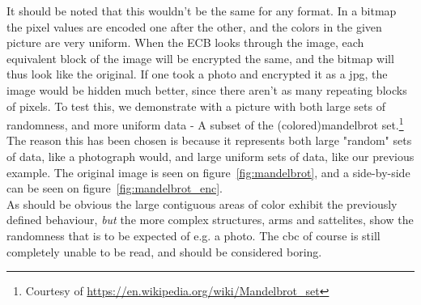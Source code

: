 \documentclass{article}
\begin{document}
It should be noted that this wouldn't be the same for any format. In a bitmap the
pixel values are encoded one after the other, and the colors in the given picture
are very uniform. When the ECB looks through the image, each equivalent block of the
image will be encrypted the same, and the bitmap will thus look like the original. If
one took a photo and encrypted it as a jpg, the image would be hidden much better,
since there aren't as many repeating blocks of pixels. To test this, we demonstrate
with a picture with both large sets of randomness, and more uniform data - A subset
of the (colored)mandelbrot set.\footnote{Courtesy of
\url{https://en.wikipedia.org/wiki/Mandelbrot_set}} The reason this has been chosen
is because it represents both large "random" sets of data, like a photograph would,
and large uniform sets of data, like our previous example. The original image is
seen on figure~\ref{fig:mandelbrot}, and a side-by-side can be seen on figure~\ref{fig:mandelbrot_enc}.\\
As should be obvious the large contiguous areas of color exhibit the previously 
defined behaviour, \emph{but} the more complex structures, arms and sattelites, show
the randomness that is to be expected of e.g. a photo.
The cbc of course is still completely unable to be read, and should be considered
boring.
\end{document}
